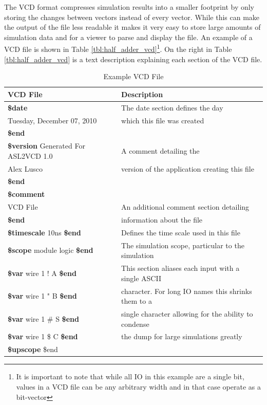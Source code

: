 \documentclass[12pt]{report}
\begin{document}
The VCD format compresses simulation results into a smaller footprint by only storing the changes between vectors instead of every vector\cite{verilog}.  While this can make the output of the file less readable it makes it very easy to store large amounts of simulation data and for a viewer to parse and display the file.  An example of a VCD file is shown in Table \ref{tbl:half_adder_vcd}\footnote{It is important to note that while all IO in this example are a single bit, values in a VCD file can be any arbitrary width and in that case operate as a bit-vector}.  On the right in Table \ref{tbl:half_adder_vcd} is a text description explaining each section of the VCD file.
\begin{table}
	\begin{center}
    \caption{Example VCD File}
		\begin{tabular}{l|l}
			VCD File & Description \\ \hline
			\textbf{\$date} & The date section defines the day\\
			Tuesday, December 07, 2010 & which this file was created \\
			\textbf{\$end} & \\
			\textbf{\$version}
			Generated For ASL2VCD 1.0 & A comment detailing the  \\
			Alex Lusco & version of the application creating this file \\
			\textbf{\$end}	\\
			\textbf{\$comment}	\\
			VCD File & An additional comment section detailing \\
			\textbf{\$end} & information about the file \\
			\textbf{\$timescale} 10ns \textbf{\$end} & Defines the time scale used in this file \\
			\textbf{\$scope} module logic \textbf{\$end} & The simulation scope, particular to the simulation \\
			\textbf{\$var} wire 1 ! A \textbf{\$end} & This section aliases each input with a single ASCII \\
			\textbf{\$var} wire 1 " B \textbf{\$end} & character. For long IO names this shrinks them to a  \\
			\textbf{\$var} wire 1 \# S \textbf{\$end} & single character allowing for the ability to condense \\
			\textbf{\$var} wire 1 \$ C \textbf{\$end} & the dump for large simulations greatly \\
			\textbf{\$upscope} \$end & \\

\end{tabular}
\end{center}
\end{table}
\end{document}
